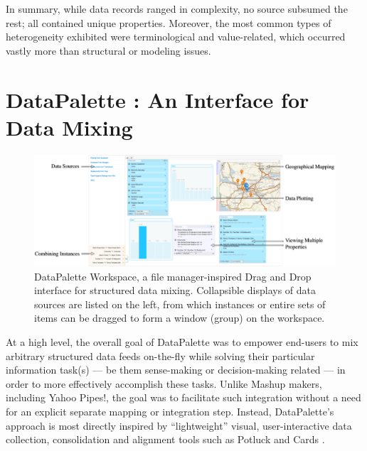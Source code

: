 \documentclass{sigchi}
\begin{document}
In summary, while data records ranged in complexity, no source subsumed the rest; all contained unique properties.  Moreover, the most common types of heterogeneity exhibited were terminological and value-related, which occurred vastly more than structural or modeling issues.

\section{DataPalette : An Interface for Data Mixing}

\begin{figure}[tbp]
\begin{center}
\includegraphics[width=18cm]{img/screenshot}
\caption{DataPalette Workspace, a file manager-inspired Drag and Drop interface for structured data mixing. Collapsible displays of data sources are listed on the left, from which instances or entire sets of items can be dragged to form a window (group) on the workspace.}
\label{fig:workspace}
\end{center}
\end{figure}

At a high level, the overall goal of DataPalette was to empower end-users to mix arbitrary structured data feeds on-the-fly while solving their particular information task(s) --- be them sense-making or decision-making related --- in order to more effectively accomplish these tasks.  Unlike Mashup makers, including Yahoo Pipes!, the goal was to facilitate such integration without a need for an explicit separate mapping or integration step.  Instead, DataPalette's approach is most directly inspired by ``lightweight'' visual, user-interactive data collection, consolidation and alignment tools such as Potluck \cite{citeulike:3875264} and Cards \cite{Dontcheva:2007:RCS:1294211.1294224}.
\end{document}
